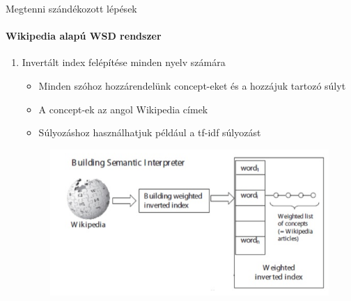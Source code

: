 \begin{frame}{Megtenni szándékozott lépések}
\framesubtitle{Wikipedia alapú WSD rendszer}

		\begin{enumerate}
			\item Invertált index felépítése minden nyelv számára	
			\begin{itemize}
				\item Minden szóhoz hozzárendelünk concept-eket és a hozzájuk tartozó súlyt
				\item A concept-ek az angol Wikipedia címek
				\item Súlyozáshoz használhatjuk például a tf-idf súlyozást
			\end{itemize}			
			
		\begin{figure}[t]
			\includegraphics[scale=0.4]{images/invindex}
 		\end{figure}			
			
			\savecounter	
		\end{enumerate}

\end{frame}

